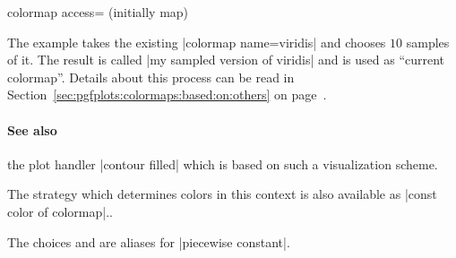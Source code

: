 \begin{pgfplotskey}{colormap access= (initially map)}
\begin{codeexample}[]
\end{codeexample}
	The example takes the existing |colormap name=viridis| and chooses $10$ samples of it. The result is called |my sampled version of viridis| and is used as ``current colormap''. Details about this process can be read in Section~\ref{sec:pgfplots:colormaps:based:on:others} on page~\pageref{sec:pgfplots:colormaps:based:on:others}.

	\paragraph{See also} the plot handler |contour filled| which is based on such a visualization scheme.

	The strategy which determines colors in this context is also available as |const color of colormap|..

	The choices  and  are aliases for |piecewise constant|.
\end{pgfplotskey}

